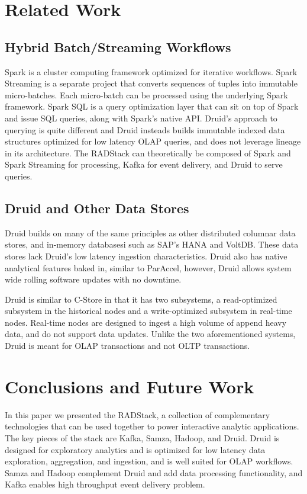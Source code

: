 \documentclass{vldb}
\begin{document}
\section{Related Work}
\label{sec:related}

\subsection{Hybrid Batch/Streaming Workflows}

Spark\cite{zaharia2012resilient} is a cluster computing framework optimized for
iterative workflows.  Spark Streaming is a separate project that converts
sequences of tuples into immutable micro-batches. Each micro-batch can be
processed using the underlying Spark framework. Spark SQL is a query
optimization layer that can sit on top of Spark and issue SQL queries, along
with Spark’s native API.  Druid’s approach to querying is quite
different and Druid insteads builds immutable indexed data structures optimized
for low latency OLAP queries, and does not leverage lineage in its architecture.
The RADStack can theoretically be composed of Spark and Spark Streaming for
processing, Kafka for event delivery, and Druid to serve queries.

\subsection{Druid and Other Data Stores}
Druid builds on many of the same principles as other distributed
columnar data stores\cite{fink2012distributed}, and in-memory databasesi such as SAP’s
HANA\cite{farber2012sap} and VoltDB\cite{voltdb2010voltdb}. These data stores
lack Druid’s low latency ingestion characteristics. Druid also has native
analytical features baked in, similar to ParAccel\cite{paraccel2013}, however,
Druid allows system wide rolling software updates with no downtime. 

Druid is similar to C-Store\cite{stonebraker2005c} in that it has two subsystems, a
read-optimized subsystem in the historical nodes and a write-optimized
subsystem in real-time nodes. Real-time nodes are designed to ingest a high
volume of append heavy data, and do not support data updates. Unlike the two
aforementioned systems, Druid is meant for OLAP transactions and not OLTP
transactions. 

\section{Conclusions and Future Work}
\label{sec:conclusions}
In this paper we presented the RADStack, a collection of complementary
technologies that can be used together to power interactive analytic
applications. The key pieces of the stack are Kafka, Samza, Hadoop, and Druid.
Druid is designed for exploratory analytics and is optimized for low latency
data exploration, aggregation, and ingestion, and is well suited for OLAP
workflows. Samza and Hadoop complement Druid and add data processing
functionality, and Kafka enables high throughput event delivery problem. 
\end{document}
